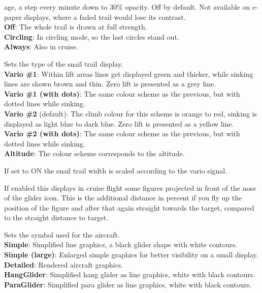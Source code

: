 \begin{description}
  age, a step every minute down to 30\% opacity.  Off by default.  Not
  available on e-paper displays, where a faded trail would lose its
  contrast. \\
  {\bf Off}: The whole trail is drawn at full strength. \\
  {\bf Circling}: In circling mode, so the last circles stand out. \\
  {\bf Always}: Also in cruise.
\item[Trail type*] \label{conf:snailtype} Sets the type of the snail trail display. \\
  {\bf Vario \#1}: Within lift areas lines get displayed green and
  thicker, while sinking lines are shown brown and thin.  Zero lift
  is presented as a grey line. \\
  {\bf Vario \#1 (with dots)}: The same colour scheme as the previous, but with dotted 
  lines while sinking. \\
  {\bf Vario \#2} (default): The climb colour for this scheme is orange to red,
  sinking is displayed as light blue to dark blue. Zero lift is presented as a
  yellow line. \\
  {\bf Vario \#2 (with dots)}: The same colour scheme as the previous, but with dotted 
  lines while sinking. \\
  {\bf Altitude}: The colour scheme corresponds to the altitude.
\item[Trail scaled*] \label{conf:trailscaled} If set to ON the snail trail 
  width is scaled according to the vario signal.
\item[Detour cost markers*]  If enabled this displays in cruise flight some
  figures projected in front of the nose of the glider icon.  This is the
  additional distance in percent if you fly up the position of the figure and
  after that again straight towards the target, compared to the straight distance
  to target.
\item[Aircraft symbol*]  Sets the symbol used for the aircraft. \\
  {\bf Simple}: Simplified line graphics, a black glider shape with white contours. \\
  {\bf Simple (large)}: Enlarged simple graphics for better visibility on a small display. \\
  {\bf Detailed}: Rendered aircraft graphics. \\
  {\bf HangGlider}: Simplified hang glider as line graphics, white with black contours. \\
  {\bf ParaGlider}: Simplified para glider as line graphics, white with black contours.

\end{description}
